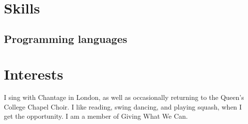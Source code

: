 \documentclass[12pt,a4paper,sans]{moderncv}
\begin{document}
\section{Skills}

\subsection{Programming languages}


\section{Interests}
I sing with Chantage in London, as well as occasionally returning to the Queen's College Chapel Choir. 
I like reading, swing dancing, and playing squash, when I get the opportunity. 
I am a member of Giving What We Can.
\end{document}

